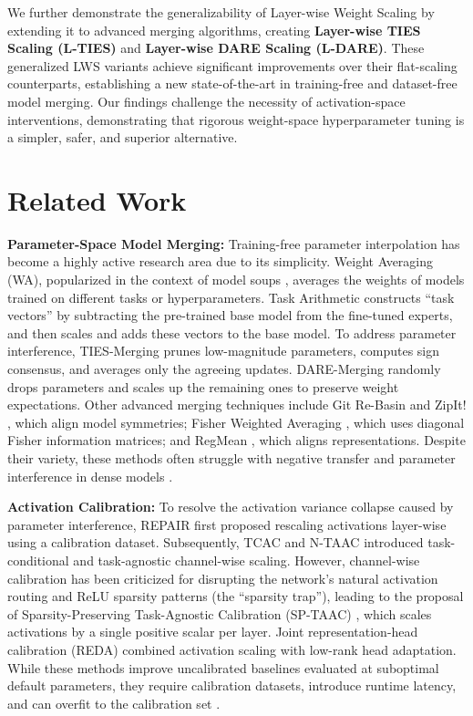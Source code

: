 \documentclass{article}
\theoremstyle{plain}
\theoremstyle{definition}
\theoremstyle{remark}
\begin{document}
We further demonstrate the generalizability of Layer-wise Weight Scaling by extending it to advanced merging algorithms, creating \textbf{Layer-wise TIES Scaling (L-TIES)} and \textbf{Layer-wise DARE Scaling (L-DARE)}. These generalized LWS variants achieve significant improvements over their flat-scaling counterparts, establishing a new state-of-the-art in training-free and dataset-free model merging. Our findings challenge the necessity of activation-space interventions, demonstrating that rigorous weight-space hyperparameter tuning is a simpler, safer, and superior alternative.

\section{Related Work}
\label{sec:related_work}

\textbf{Parameter-Space Model Merging:} Training-free parameter interpolation has become a highly active research area due to its simplicity. Weight Averaging (WA), popularized in the context of model soups \cite{model_soup}, averages the weights of models trained on different tasks or hyperparameters. Task Arithmetic \cite{task_arithmetic, task_vectors_empirical} constructs ``task vectors'' by subtracting the pre-trained base model from the fine-tuned experts, and then scales and adds these vectors to the base model. To address parameter interference, TIES-Merging \cite{ties_merging} prunes low-magnitude parameters, computes sign consensus, and averages only the agreeing updates. DARE-Merging \cite{dare} randomly drops parameters and scales up the remaining ones to preserve weight expectations. Other advanced merging techniques include Git Re-Basin \cite{git_rebasin} and ZipIt! \cite{zipit}, which align model symmetries; Fisher Weighted Averaging \cite{fisher_merging}, which uses diagonal Fisher information matrices; and RegMean \cite{regmean}, which aligns representations. Despite their variety, these methods often struggle with negative transfer and parameter interference in dense models \cite{parameter_interference_survey, ties_merging_limit, dare_theoretical}.

\textbf{Activation Calibration:} To resolve the activation variance collapse caused by parameter interference, REPAIR \cite{repair} first proposed rescaling activations layer-wise using a calibration dataset. Subsequently, TCAC and N-TAAC \cite{head_adaptation, deconstructing_cal} introduced task-conditional and task-agnostic channel-wise scaling. However, channel-wise calibration has been criticized for disrupting the network's natural activation routing and ReLU sparsity patterns (the ``sparsity trap''), leading to the proposal of Sparsity-Preserving Task-Agnostic Calibration (SP-TAAC) \cite{sp_taac}, which scales activations by a single positive scalar per layer. Joint representation-head calibration (REDA) \cite{head_adaptation} combined activation scaling with low-rank head adaptation. While these methods improve uncalibrated baselines evaluated at suboptimal default parameters, they require calibration datasets, introduce runtime latency, and can overfit to the calibration set \cite{overfitting}.
\end{document}
